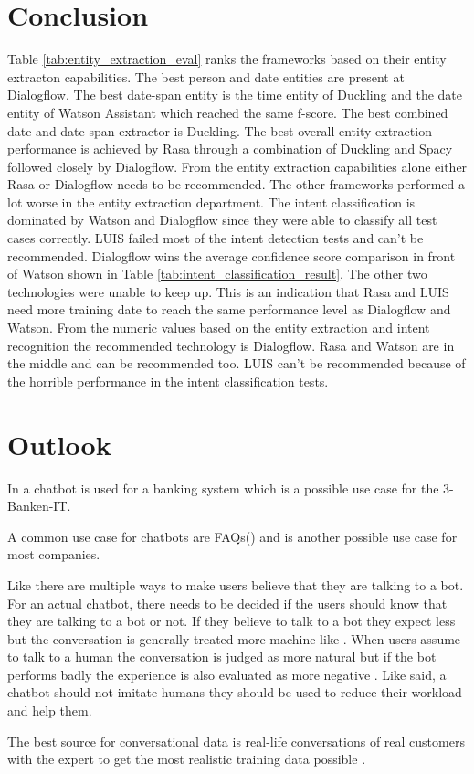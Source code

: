 \section{Conclusion}
Table \ref{tab:entity_extraction_eval} ranks the frameworks based on their 
entity extracton capabilities.
The best person and date entities are present at Dialogflow.
The best date-span entity is the time entity of Duckling 
and the date entity of Watson Assistant which reached the same f-score.
The best combined date and date-span extractor is Duckling.
The best overall entity extraction performance is achieved by Rasa through 
a combination of Duckling and Spacy followed closely by Dialogflow.
From the entity extraction capabilities alone either Rasa or 
Dialogflow needs to be recommended.
The other frameworks performed a lot worse in the entity extraction 
department.
The intent classification is dominated by Watson and Dialogflow since they were able to classify all test cases correctly.
LUIS failed most of the intent detection tests and can't be recommended.
Dialogflow wins the average confidence score comparison in front of Watson 
shown in Table \ref{tab:intent_classification_result}.
The other two technologies were unable to keep up.
This is an indication that Rasa and LUIS need more training date to 
reach the same performance level as Dialogflow and Watson.
From the numeric values based on the entity extraction and intent recognition 
the recommended technology is Dialogflow.
Rasa and Watson are in the middle and can be recommended too.
LUIS can't be recommended because of the horrible performance in the intent classification tests.





\section{Outlook}
In \citet{singhbuilding} a chatbot is used for a banking system which is a possible use case for the 3-Banken-IT.

A common use case for chatbots are FAQs(\citet{evaluateChatbotsShawar2007, buiildChatbotsPython, huang2007extracting, GO2019304}) 
and is another possible use case for most companies.


Like \citet{GO2019304} there are multiple ways to make users believe that they are talking to a bot.
For an actual chatbot, there needs to be decided if the users should know that they are talking to a bot or not.
If they believe to talk to a bot they expect less but the conversation is generally treated more machine-like \cite{GO2019304}.
When users assume to talk to a human the conversation is judged as more natural but if the bot performs badly the experience is also evaluated as more negative \cite{GO2019304}.
Like \citet{shawar2007chatbots} said, a chatbot should not imitate humans they should be used to reduce their workload and help them.

The best source for conversational data is real-life conversations of real customers with the expert to get the most realistic training data possible \cite{singhbuilding}.





